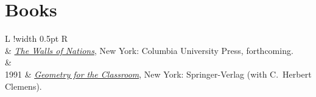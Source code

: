 \documentclass[10pt]{article}
\newcommand\VRule{\color{lightgray}\vrule width 0.5pt}
\begin{document}
\section{Books} 
\begin{longtable}{L !{\VRule}  R}
	\endfirsthead
	 \\ [+3.5ex] 
	 & \href{}{\textit{The Walls of Nations}}, New York: Columbia University Press, forthcoming.\\
	&\\[-1ex]
	1991 & \href{https://doi.org/10.1007/978-1-4612-0961-4}{\textit{Geometry for the Classroom}}, New York: Springer-Verlag (with C.\ Herbert Clemens).\\
\end{longtable}
\end{document}
